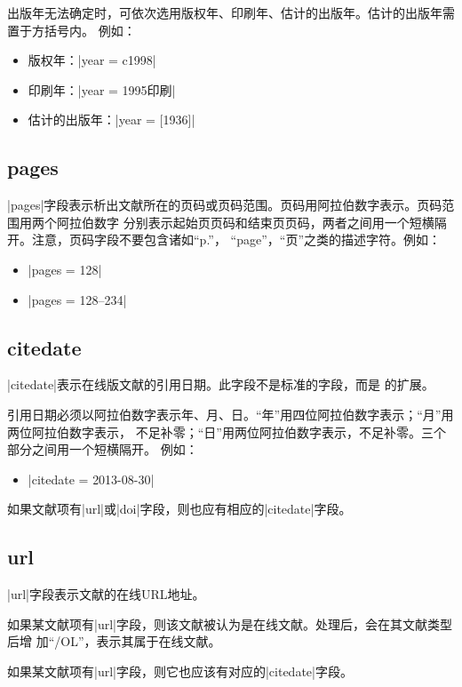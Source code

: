 出版年无法确定时，可依次选用版权年、印刷年、估计的出版年。估计的出版年需置于方括号内。
例如：
\begin{itemize}
\item 版权年：|year = {c1998}|
\item 印刷年：|year = 1995印刷|
\item 估计的出版年：|year = {[1936]}|
\end{itemize}

\subsection{pages}\label{subsec:bibfield-pages}

|pages|字段表示析出文献所在的页码或页码范围。页码用阿拉伯数字表示。页码范围用两个阿拉伯数字
分别表示起始页页码和结束页页码，两者之间用一个短横隔开。注意，页码字段不要包含诸如``p.''，
``page''，``页''之类的描述字符。例如：
\begin{itemize}
\item |pages = {128}|
\item |pages = {128--234}|
\end{itemize}

\subsection{citedate}\label{subsec:bibfield-citedate}

|citedate|表示在线版文献的引用日期。此字段不是标准的{\BibTeX}字段，而是{\njuthesis}
的扩展。

引用日期必须以阿拉伯数字表示年、月、日。“年”用四位阿拉伯数字表示；“月”用两位阿拉伯数字表示，
不足补零；“日”用两位阿拉伯数字表示，不足补零。三个部分之间用一个短横隔开。
例如：
\begin{itemize}
\item |citedate = {2013-08-30}|
\end{itemize}

如果文献项有|url|或|doi|字段，则也应有相应的|citedate|字段。

\subsection{url}\label{subsec:bibfield-url}

|url|字段表示文献的在线URL地址。

如果某文献项有|url|字段，则该文献被认为是在线文献。{\BibTeX}处理后，会在其文献类型后增
加``/OL''，表示其属于在线文献。

如果某文献项有|url|字段，则它也应该有对应的|citedate|字段。

